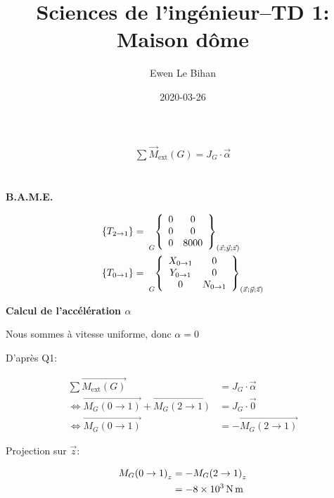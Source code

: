 \documentclass{article}
\title{Sciences de l'ingénieur--TD 1: Maison dôme}
\author{Ewen Le Bihan}
\date{2020-03-26}
\newcommand{\torseur}[7]{
\tensor[_{#1}]{\left\{ \begin{array}{cc}
    #2 & #5 \\
    #3 & #6 \\
    #4 & #7
\end{array} \right\}}{_{(\vec{x};\vec{y};\vec{z})}}
}
\newcommand{\vect}[1]{\overrightarrow{#1}}
\begin{document}
\maketitle

\section{}

\begin{equation*}
    \begin{split}
        \sum \vec M_\text{ext}(G) = J_G \cdot \vec \alpha
    \end{split}
\end{equation*}

\section{}
\textbf{B.A.M.E.}

\begin{equation*}
    \begin{split}
        \{T_{2\to1}\} &= \torseur{G}{0}{0}{0}{0}{0}{8000}\\
        \{T_{0\to1}\} &= \torseur{G}{X_{0\to1}}{Y_{0\to1}}{0}{0}{0}{N_{0\to1}}
    \end{split}
\end{equation*}

\textbf{Calcul de l'accélération $\alpha$}

Nous sommes à vitesse uniforme, donc $\alpha = 0$

D'après Q1:

\begin{equation*}
    \begin{split}
        \sum \vect{M_\text{ext}(G)} &= J_G \cdot \vec \alpha \\
        \iff \vect{M_G(0\to1)} + \vect{M_G(2\to1)} &= J_G \cdot \vec 0 \\
        \iff \vect{M_G(0\to1)} &= -\vect{M_G(2\to1)}
    \end{split}
\end{equation*}

Projection sur $\vec z$:

\begin{equation*}
    \begin{split}
        {M_G(0\to1)}_z &= -{M_G(2\to1)}_z \\
                       &= \SI{-8E3}{\newton\meter}
    \end{split}
\end{equation*}
\end{document}
